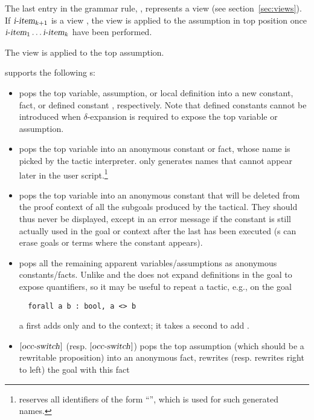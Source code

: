 The last entry in the  grammar rule, \ssrC{/}{\term},
represents a view (see section~\ref{sec:views}). If $\ssrN[k+1]{i-item}$
is a view , the view is applied to the assumption in top
position once $\ssrN[1]{i-item} \dots \ssrN[k]{i-item}$ have been performed.

The view is applied to the top assumption.

\ssr{} supports the following s:
\begin{itemize}
\item {} pops the top variable, assumption, or local definition into
      a new constant, fact, or defined constant , respectively.
      Note that defined constants cannot be introduced when
      $\delta$-expansion is required to expose the top variable or assumption.
\item {} pops the top variable into an anonymous constant or fact,
      whose name is picked by the tactic interpreter.
      \ssr{} only generates names that
      cannot appear later in the user script.\footnote{\ssr{} reserves
      all identifiers of the form ``'', which is used for such
      generated names.}
\item \ssrC{_} pops the top variable into an anonymous constant that will be
     deleted from
     the proof context of all the subgoals produced by the \ssrC{=>} tactical.
     They should thus never be displayed, except in an error message
     if the constant is still actually used in the goal or context after
     the last  has been executed (s can erase goals
     or terms where the constant appears).
\item \ssrC{*} pops all the remaining apparent variables/assumptions
     as anonymous constants/facts. Unlike  and  the \ssrC{*}
      does not expand definitions in the goal to expose
     quantifiers, so it may be useful to repeat a  tactic,
     e.g., on the goal
\begin{lstlisting}
  forall a b : bool, a <> b
\end{lstlisting}
a first  adds only  and  to
the context; it takes a second  to add
.
\item $[\ssrN{occ-switch}]$\ssrC{->} (resp. $[\ssrN{occ-switch}]$\ssrC{<-})
  pops the top assumption
  (which should be a rewritable proposition) into an anonymous fact,
  rewrites (resp. rewrites right to left) the goal with this fact

\end{itemize}
